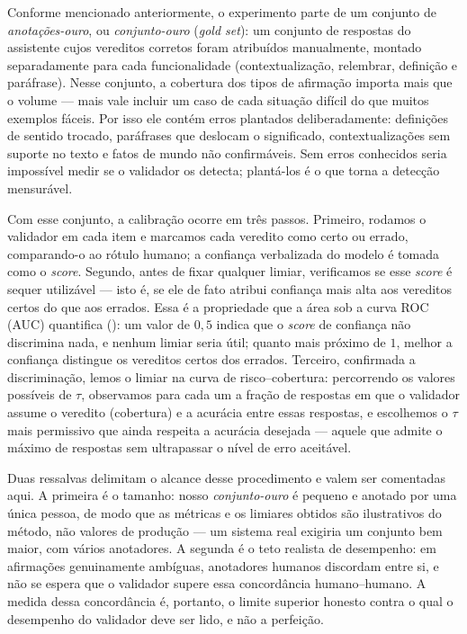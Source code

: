 Conforme mencionado anteriormente, o experimento parte de um conjunto de \textit{anotações-ouro}, ou \textit{conjunto-ouro} (\textit{gold set}): um conjunto de respostas do assistente cujos vereditos corretos foram atribuídos manualmente, montado separadamente para cada funcionalidade (contextualização, relembrar, definição e paráfrase). Nesse conjunto, a cobertura dos tipos de afirmação importa mais que o volume --- mais vale incluir um caso de cada situação difícil do que muitos exemplos fáceis. Por isso ele contém erros plantados deliberadamente: definições de sentido trocado, paráfrases que deslocam o significado, contextualizações sem suporte no texto e fatos de mundo não confirmáveis. Sem erros conhecidos seria impossível medir se o validador os detecta; plantá-los é o que torna a detecção mensurável.

Com esse conjunto, a calibração ocorre em três passos. Primeiro, rodamos o validador em cada item e marcamos cada veredito como certo ou errado, comparando-o ao rótulo humano; a confiança verbalizada do modelo é tomada como o \textit{score}. Segundo, antes de fixar qualquer limiar, verificamos se esse \textit{score} é sequer utilizável --- isto é, se ele de fato atribui confiança mais alta aos vereditos certos do que aos errados. Essa é a propriedade que a área sob a curva ROC (AUC) quantifica (\cite{Fawcett2006ROC}): um valor de $0{,}5$ indica que o \textit{score} de confiança não discrimina nada, e nenhum limiar seria útil; quanto mais próximo de $1$, melhor a confiança distingue os vereditos certos dos errados. Terceiro, confirmada a discriminação, lemos o limiar na curva de risco--cobertura: percorrendo os valores possíveis de $\tau$, observamos para cada um a fração de respostas em que o validador assume o veredito (cobertura) e a acurácia entre essas respostas, e escolhemos o $\tau$ mais permissivo que ainda respeita a acurácia desejada --- aquele que admite o máximo de respostas sem ultrapassar o nível de erro aceitável.

Duas ressalvas delimitam o alcance desse procedimento e valem ser comentadas aqui. A primeira é o tamanho: nosso \textit{conjunto-ouro} é pequeno e anotado por uma única pessoa, de modo que as métricas e os limiares obtidos são ilustrativos do método, não valores de produção --- um sistema real exigiria um conjunto bem maior, com vários anotadores. A segunda é o teto realista de desempenho: em afirmações genuinamente ambíguas, anotadores humanos discordam entre si, e não se espera que o validador supere essa concordância humano--humano. A medida dessa concordância é, portanto, o limite superior honesto contra o qual o desempenho do validador deve ser lido, e não a perfeição.


